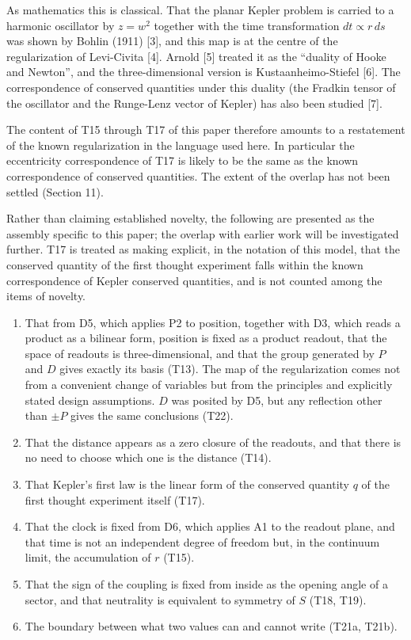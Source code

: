 \documentclass[
  a4paper,
]{article}
\providecommand{\tightlist}{%
  \setlength{\itemsep}{0pt}\setlength{\parskip}{0pt}}
\begin{document}
As mathematics this is classical. That the planar Kepler problem is
carried to a harmonic oscillator by \(z=w^2\) together with the time
transformation \(dt\propto r\,ds\) was shown by Bohlin (1911) {[}3{]},
and this map is at the centre of the regularization of Levi-Civita
{[}4{]}. Arnold {[}5{]} treated it as the ``duality of Hooke and
Newton'', and the three-dimensional version is Kustaanheimo-Stiefel
{[}6{]}. The correspondence of conserved quantities under this duality
(the Fradkin tensor of the oscillator and the Runge-Lenz vector of
Kepler) has also been studied {[}7{]}.

The content of T15 through T17 of this paper therefore amounts to a
restatement of the known regularization in the language used here. In
particular the eccentricity correspondence of T17 is likely to be the
same as the known correspondence of conserved quantities. The extent of
the overlap has not been settled (Section 11).

Rather than claiming established novelty, the following are presented as
the assembly specific to this paper; the overlap with earlier work will
be investigated further. T17 is treated as making explicit, in the
notation of this model, that the conserved quantity of the first thought
experiment falls within the known correspondence of Kepler conserved
quantities, and is not counted among the items of novelty.

\begin{enumerate}
\def\labelenumi{\arabic{enumi}.}
\tightlist
\item
  That from D5, which applies P2 to position, together with D3, which
  reads a product as a bilinear form, position is fixed as a product
  readout, that the space of readouts is three-dimensional, and that the
  group generated by \(P\) and \(D\) gives exactly its basis (T13). The
  map of the regularization comes not from a convenient change of
  variables but from the principles and explicitly stated design
  assumptions. \(D\) was posited by D5, but any reflection other than
  \(\pm P\) gives the same conclusions (T22).
\item
  That the distance appears as a zero closure of the readouts, and that
  there is no need to choose which one is the distance (T14).
\item
  That Kepler's first law is the linear form of the conserved quantity
  \(q\) of the first thought experiment itself (T17).
\item
  That the clock is fixed from D6, which applies A1 to the readout
  plane, and that time is not an independent degree of freedom but, in
  the continuum limit, the accumulation of \(r\) (T15).
\item
  That the sign of the coupling is fixed from inside as the opening
  angle of a sector, and that neutrality is equivalent to symmetry of
  \(S\) (T18, T19).
\item
  The boundary between what two values can and cannot write (T21a,
  T21b).
\end{enumerate}
\end{document}
